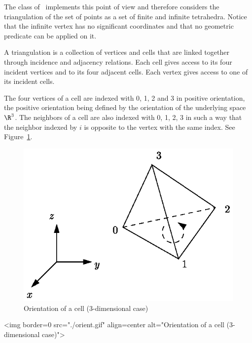 The class  of \cgal\ implements this
point of view and therefore considers the triangulation of the set
of points as a set of finite and infinite tetrahedra.  Notice that the
infinite vertex has no significant coordinates and that no
geometric predicate can be applied on it.

A triangulation is a collection of vertices and cells that are linked
together through incidence and adjacency relations. Each cell gives
access to its four incident vertices and to its four adjacent
cells. Each vertex gives access to one of its incident cells.

The four vertices of a cell are indexed with 0, 1, 2 and 3 in positive
orientation, the positive orientation being defined by the orientation
of the underlying space $\R^3$. The neighbors of a cell are also
indexed with 0, 1, 2, 3 in such a way that the neighbor indexed by $i$
is opposite to the vertex with the same index. See
Figure~\ref{Triangulation3-fig-orient}.

\begin{ccTexOnly}
\begin{figure}[htbp]
\begin{center} 
\includegraphics{orient.eps} 
\end{center}
\caption{Orientation of a cell (3-dimensional case) 
\label{Triangulation3-fig-orient}}
\end{figure} 
\end{ccTexOnly}

\begin{ccHtmlOnly}
<img border=0 src="./orient.gif" align=center alt="Orientation of a cell 
(3-dimensional case)">
\end{ccHtmlOnly}

